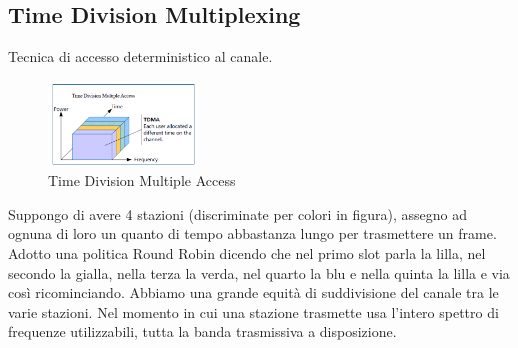 \documentclass[12pt,italian]{report}
\begin{document}
\subsection{Time Division Multiplexing}
Tecnica di accesso deterministico al canale.
\begin{figure}[h]
\centering
\includegraphics[width=40mm]{img/TDA.PNG}
\caption{Time Division Multiple Access}
\label{fig:tda}
\end{figure}
Suppongo di avere 4 stazioni (discriminate per colori in figura), assegno ad ognuna di loro un quanto di tempo abbastanza lungo per trasmettere un frame. Adotto una politica Round Robin dicendo che nel primo slot parla la lilla, nel secondo la gialla, nella terza la verda, nel quarto la blu e nella quinta la lilla e via così ricominciando. Abbiamo una grande equità di suddivisione del canale tra le varie stazioni. Nel momento in cui una stazione trasmette usa l'intero spettro di frequenze utilizzabili, tutta la banda trasmissiva a disposizione. 
\end{document}
